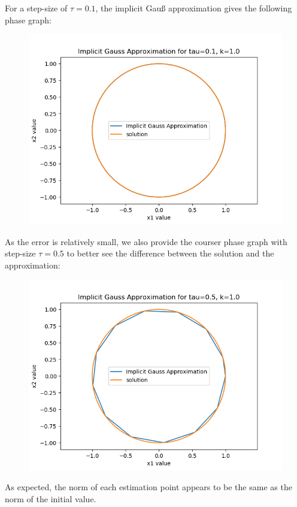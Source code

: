 \documentclass{article}
\theoremstyle{definition}
\begin{document}
\begin{itemize}
		For a step-size of $\tau=0.1$,
		the implicit Gau{\ss} approximation gives the following
		phase graph:
		\begin{figure}[H]
			\includegraphics[scale=0.6]{harmonic_phase_gaus_01}
		\end{figure}
		As the error is relatively small, we also provide the
		courser phase graph with step-size $\tau=0.5$ to better see the
		difference between the solution and the approximation:
		\begin{figure}[H]
			\includegraphics[scale=0.6]{harmonic_phase_gaus_05}
		\end{figure}
		As expected, the norm of each estimation point appears to be the
		same as the norm of the initial value.


\end{itemize}
\end{document}

